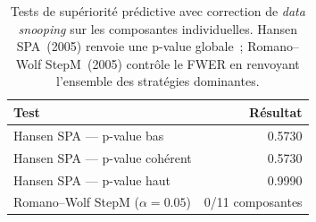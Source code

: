 \begin{table}[H]
\centering
\caption{Tests de supériorité prédictive avec correction de \textit{data snooping} sur les composantes individuelles. Hansen SPA~(2005) renvoie une p-value globale~; Romano--Wolf StepM~(2005) contrôle le FWER en renvoyant l'ensemble des stratégies dominantes.}
\label{tab:robustness_arch_tests}
\begin{tabular}{lr}
\toprule
Test & Résultat \\
\midrule
Hansen SPA --- p-value bas & 0.5730 \\
Hansen SPA --- p-value cohérent & 0.5730 \\
Hansen SPA --- p-value haut & 0.9990 \\
Romano--Wolf StepM ($\alpha = 0.05$) & 0/11 composantes \\
\bottomrule
\end{tabular}
\end{table}
